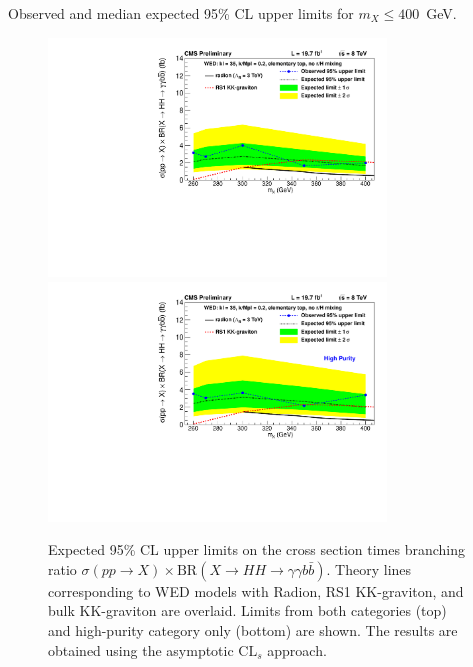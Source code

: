 \begin{table}[htbp!]
  \centering
  \renewcommand{\arraystretch}{1.4}
  \caption{Observed and median expected 95\% CL upper limits for $m_X \le 400$~GeV.}
  
  \label{table:limits_lowmass}
\end{table}

\begin{figure}[htbp!]
 \begin{center}
   \includegraphics[width=0.8\textwidth]{figures/results/WP4_cutbased_low_all.pdf}
   \includegraphics[width=0.8\textwidth]{figures/results/WP4_cutbased_low_base_onecat.pdf}
 \end{center}
\caption{Expected 95\% CL upper limits on the cross section times branching ratio
$\sigma(pp\rightarrow X) \times \text{BR}( X \rightarrow HH \rightarrow \gamma\gamma b\bar{b})$.
Theory lines corresponding to WED models with Radion, RS1 KK-graviton, and bulk KK-graviton are
overlaid. Limits from both categories (top) and high-purity category only (bottom) are shown.
The results are obtained using the asymptotic $\text{CL}_s$ approach.}
\label{fig:limits_lowmassres}
\end{figure}

